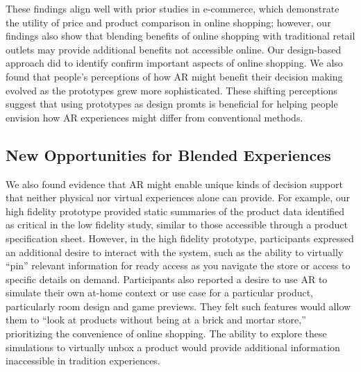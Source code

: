 These findings align well with prior studies in e-commerce, which demonstrate the utility of price and product comparison in online shopping; however, our findings also show that blending benefits of online shopping with traditional retail outlets may provide additional benefits not accessible online. Our design-based approach did to identify confirm important aspects of online shopping. We also found that people's perceptions of how AR might benefit their decision making evolved as the prototypes grew more sophisticated. These shifting perceptions suggest that using prototypes as design promts is beneficial for helping people envision how AR experiences might differ from conventional methods. 

\subsection{New Opportunities for Blended Experiences}
We also found evidence that AR might enable unique kinds of decision support that neither physical nor virtual experiences alone can provide. For example, our high fidelity prototype provided static summaries of the product data identified as critical in the low fidelity study, similar to those accessible through a product specification sheet. However, in the high fidelity prototype, participants expressed an additional desire to interact with the system, such as the ability to virtually ``pin'' relevant information for ready access as you navigate the store or access to specific details on demand. 
Participants also reported a desire to use AR to simulate their own at-home context or use case for a particular product, particularly room design and game previews. They felt such features would allow them to ``look at products without being at a brick and mortar store,'' prioritizing the convenience of online shopping. The ability to explore these simulations to virtually unbox a product would provide additional information inaccessible in tradition experiences.

